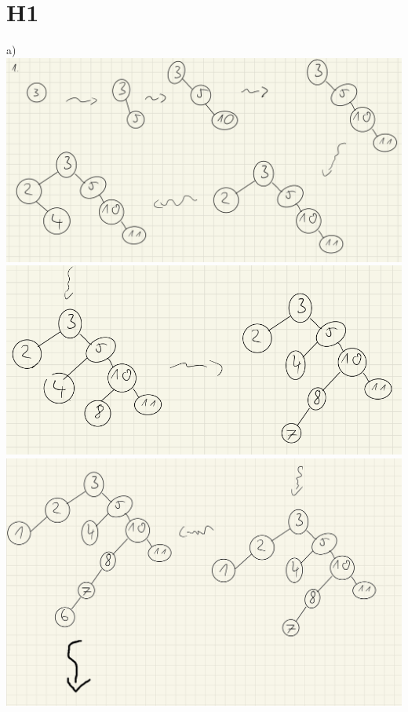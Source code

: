 \documentclass{article}
\begin{document}
\section{H1}
\setlength\leftskip{1cm}
\noindent a) \\
\includegraphics[scale=0.5]{ h1_a} \\ 
\bigskip
\includegraphics[scale=0.5]{ h1_a2} \\ 
\bigskip
\includegraphics[scale=0.15]{ h1_a3 } \\ 
\bigskip
\end{document}
